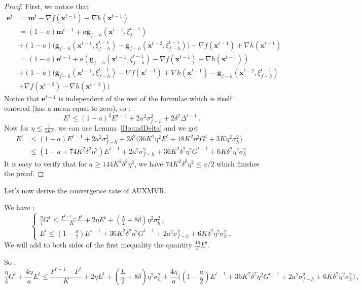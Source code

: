 \documentclass[10pt]{article} %
\theoremstyle{plain}
\theoremstyle{definition}
\theoremstyle{remark}
\def\ve{{\bm{e}}}
\def\vg{{\bm{g}}}
\def\vm{{\bm{m}}}
\def\vx{{\bm{x}}}
\begin{document}
\begin{proof}
First, we notice that 
\begin{align*}
    \ve^t&=\vm^t - \nabla f(\vx^{t-1}) + \nabla h(\vx^{t-1}) \\&= (1-a)\vm^{t-1} + a \vg_{f-h}(\vx^{t-1},\xi^{t-1}_f) \\&+ (1 - a)\Big(\vg_{f-h}(\vx^{t-1},\xi^{t-1}_{f-h}) - \vg_{f-h}(\vx^{t-2},\xi^{t-1}_{f-h})\Big) - \nabla f(\vx^{t-1}) + \nabla h(\vx^{t-1})\\
    &=(1-a)\ve^{t-1} + a (\vg_{f-h}(\vx^{t-1},\xi^{t-1}_{f-h}) - \nabla f(\vx^{t-1}) + \nabla h(\vx^{t-1}) ) \\&+ (1 - a)\big(\vg_{f-h}(\vx^{t-1},\xi^{t-1}_{f-h}) - \nabla f(\vx^{t-1}) + \nabla h(\vx^{t-1}) - \vg_{f-h}(\vx^{t-2},\xi^{t-1}_{f-h}) \\&+ \nabla f(\vx^{t-2}) - \nabla h(\vx^{t-2})\big)
\end{align*}
Notice that $\ve^{t-1}$ is independent of the rest of the formulae which is itself centered (has a mean equal to zero), so :
$$E^t
    \leq (1-a)^2 E^{t-1}+ 2 a^2 \sigma_{f-h}^2 + 2 \delta^2\Delta^{t-1}\, .$$
Now for $\eta\leq \frac{1}{5K\delta}$, we can use Lemma~\ref{BoundDelta} and we get
\begin{align*}
    E^t
    &\leq (1-a) E^{t-1}+ 2 a^2 \sigma_{f-h}^2 + 2 \delta^2\big(36 K^2 \eta^2 E^t + 18 K^2 \eta^2 G^t + 3K\eta^2\sigma_h^2\big)\,\\
    &\leq (1-a + 74K^2\delta^2 \eta^2) E^{t-1}+ 2 a^2 \sigma_{f-h}^2 + 36 K^2 \delta^2\eta^2 G^{t-1} + 6K\delta^2\eta^2\sigma_h^2\,
\end{align*}
It is easy to verify that for $a\geq 144 K^2\delta^2\eta^2$, we have $74K^2\delta^2 \eta^2 \leq a/2$ which finishes the proof.
\end{proof}


Let's now derive the convergence rate of AUXMVR.

We have : $$\left\{
    \begin{array}{ll}
        \frac{\eta}{4}G^t \leq  \frac{F^{t-1} - F^t}{K} + 2 \eta E^t + (\frac{L}{2}+ 8\delta)\eta^2\sigma_h^2\, , \\
        E^t \leq (1 - \frac{a}{2})E^{t-1} + 36 K^2\delta^2\eta^2 G^{t-1} + 2 a^2 \sigma_{f-h}^2 + 6K\delta^2\eta^2\sigma_h^2\, .
    \end{array}
\right.$$
 We will add to both sides of the first inequality the quantity $\frac{4\eta}{a}E^t$.
 
 So : $$\frac{\eta}{4}G^t + \frac{4\eta}{a}E^t\leq  \frac{F^{t-1} - F^t}{K} + 2 \eta E^t  + (\frac{L}{2}+ 8\delta)\eta^2\sigma_h^2 + \frac{4\eta}{a}\Big((1 - \frac{a}{2})E^{t-1} + 36 K^2\delta^2\eta^2 G^{t-1} + 2 a^2 \sigma_{f-h}^2 + 6K\delta^2\eta^2\sigma_h^2\Big)\, ,$$
\end{document}
